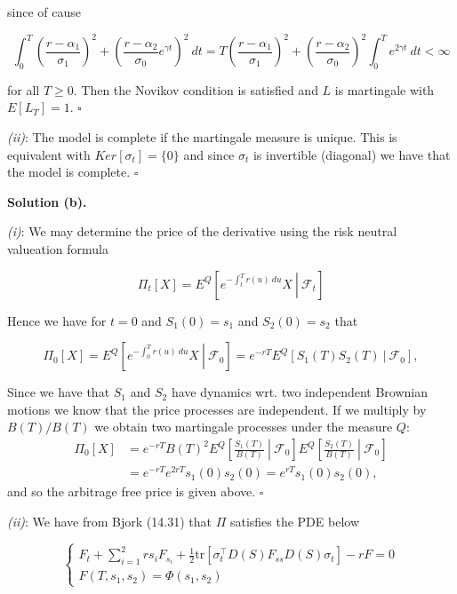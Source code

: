 \documentclass[a4paper,12pt,openany]{book}
\begin{document}
since of cause

\[
\int_0^T(\frac{r-\alpha_1}{\sigma_1})^2+(\frac{r-\alpha_2}{\sigma_0}e^{\gamma t})^2\ dt=T(\frac{r-\alpha_1}{\sigma_1})^2+(\frac{r-\alpha_2}{\sigma_0})^2\int_0^Te^{2\gamma t}\ dt<\infty
\]

for all \(T\ge 0\). Then the Novikov condition is satisfied and \(L\) is martingale with \(E[L_T]=1\). \(\square\)

\emph{(ii)}: The model is complete if the martingale measure is unique. This is equivalent with \(Ker[\sigma_t]=\{0\}\) and since \(\sigma_t\) is invertible (diagonal) we have that the model is complete. \(\square\)

\noindent\makebox[\linewidth]{\rule{\textwidth}{0.4pt}}

\textbf{Solution (b).}

\emph{(i)}: We may determine the price of the derivative using the risk neutral valueation formula

\[
\Pi_t[X]=E^Q\left[\left.e^{-\int_t^Tr(u)\ du}X\ \right\vert\ \mathcal{F}_t\right]
\]

Hence we have for \(t=0\) and \(S_1(0)=s_1\) and \(S_2(0)=s_2\) that

\[
\Pi_0[X]=E^Q\left[\left.e^{-\int_0^Tr(u)\ du}X\ \right\vert\ \mathcal{F}_0\right]=e^{-rT}E^Q\left[\left. S_1(T)S_2(T)\ \right\vert\ \mathcal{F}_0\right],
\]

Since we have that \(S_1\) and \(S_2\) have dynamics wrt. two independent Brownian motions we know that the price processes are independent. If we multiply by \(B(T)/B(T)\) we obtain two martingale processes under the measure \(Q\):
\begin{align*}
\Pi_0[X]&=e^{-rT}B(T)^2E^Q\left[\left. \frac{S_1(T)}{B(T)}\ \right\vert\ \mathcal{F}_0\right]E^Q\left[\left. \frac{S_2(T)}{B(T)}\ \right\vert\ \mathcal{F}_0\right]\\
&=e^{-rT}e^{2rT}s_1(0)s_2(0)=e^{rT}s_1(0)s_2(0),
\end{align*}
and so the arbitrage free price is given above. \(\square\)

\emph{(ii)}: We have from Bjork (14.31) that \(\Pi\) satisfies the PDE below

\[
\begin{cases}
F_t+\sum_{i=1}^2rs_iF_{s_i}+\frac{1}{2}\text{tr}[\sigma_t^\top D(S)F_{ss}D(S)\sigma_t]-rF=0\\
F(T,s_1,s_2)=\Phi(s_1,s_2)
\end{cases}
\]
\end{document}
